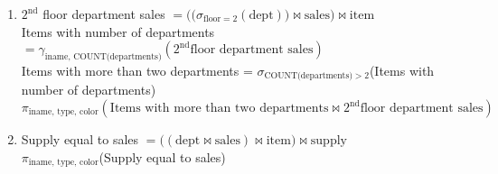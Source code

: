 \documentclass[12pt]{article}
\begin{document}
\begin{enumerate}
    \item $2^{\text{nd}}$ floor department sales $=\Big(\big(\sigma_{\text{floor}=2}(\text{dept})\big)\Join \text{sales}\Big) \Join \text{item}$\\
          Items with number of departments $= \gamma_{\text{iname, COUNT(departments)}}(2^{\text{nd}}\text{floor department sales})$\\
          Items with more than two departments = $\sigma_{\text{COUNT(departments)}>2}$(Items with number of departments)\\
          $\pi_{\text{iname, type, color}}(\text{Items with more than two departments} \Join 2^{\text{nd}}\text{floor department sales})$\\[1cm]
    \item  %
          Supply equal to sales $=\big((\text{dept}\Join \text{sales}) \Join \text{item}\big) \Join \text{supply}$\\
          $\pi_{\text{iname, type, color}}$(Supply equal to sales)
\end{enumerate}
\end{document}
